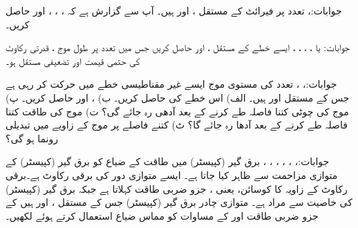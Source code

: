 جوابات:، 
 تعدد پر  فیرائٹ کے مستقل ،  اور  ہیں۔ آپ سے گزارش ہے کہ ، ، ،   اور  حاصل کریں۔

جوابات: یا ، ، ، ، 
ایسے خطے کے مستقل ،  اور  حاصل کریں جس میں   تعدد پر طول موج ، قدرتی رکاوٹ کی حتمی قیمت  اور  تضعیفی مستقل  ہو۔

جوابات:،  ،
 تعدد کی مستوی موج ایسے  غیر مقناطیسی خطے میں حرکت کر رہی ہے جس کے مستقل  اور  ہیں۔ الف) اس خطے کی  حاصل کریں۔ ب) ،  اور  حاصل کریں۔ پ) موج کی چوٹی کتنا فاصلہ طے کرنے کے بعد آدھی رہ جائے گی؟  ت) موج کی طاقت کتنا فاصلہ طے کرنے کے بعد آدھا رہ جائے گا؟   ٹ) کتنے فاصلے پر موج کے زاویے میں  تبدیلی رونما ہو گی؟

جوابات:، ، ، ، ، ، 
برق گیر (کپیسٹر)   میں طاقت کے ضیاع کو برق گیر (کپیسٹر)  کے متوازی مزاحمت  سے ظاہر کیا جاتا ہے۔ ایسے متوازی دور کی برقی رکاوٹ  ہے۔برقی رکاوٹ کے زاویہ  کا کوسائن، یعنی ، جزو ضربی طاقت کہلاتا ہے جبکہ برق گیر (کپیسٹر)  کی خاصیت  سے مراد  ہے۔ متوازی چادر برق گیر (کپیسٹر)   جس کے مستقل ،  اور  ہیں کے جزو ضربی طاقت اور  کے مساوات کو مماس ضیاع  استعمال کرتے ہوئے لکھیں۔

